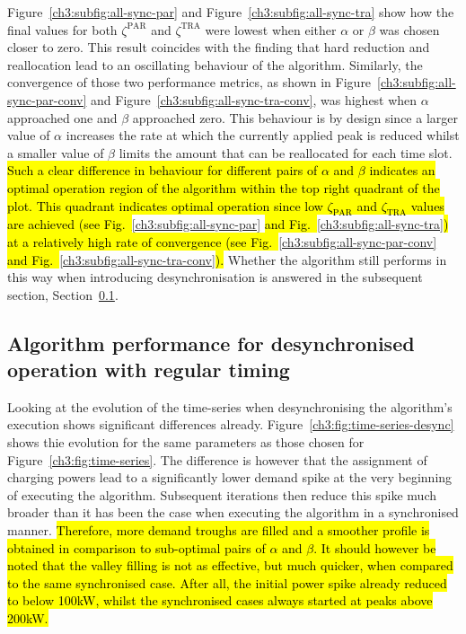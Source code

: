 Figure~\ref{ch3:subfig:all-sync-par} and Figure~\ref{ch3:subfig:all-sync-tra} show how the final values for both $\zeta^\text{PAR}$ and $\zeta^\text{TRA}$ were lowest when either $\alpha$ or $\beta$ was chosen closer to zero.
This result coincides with the finding that hard reduction and reallocation lead to an oscillating behaviour of the algorithm.
Similarly, the convergence of those two performance metrics, as shown in Figure~\ref{ch3:subfig:all-sync-par-conv} and Figure~\ref{ch3:subfig:all-sync-tra-conv}, was highest when $\alpha$ approached one and $\beta$ approached zero.
This behaviour is by design since a larger value of $\alpha$ increases the rate at which the currently applied peak is reduced whilst a smaller value of $\beta$ limits the amount that can be reallocated for each time slot.
\hl{Such a clear difference in behaviour for different pairs of $\alpha$ and $\beta$ indicates an optimal operation region of the algorithm within the top right quadrant of the plot.
This quadrant indicates optimal operation since low $\zeta_\text{PAR}$ and $\zeta_\text{TRA}$ values are achieved (see Fig.~}\ref{ch3:subfig:all-sync-par}\hl{ and Fig.~}\ref{ch3:subfig:all-sync-tra}\hl{) at a relatively high rate of convergence (see Fig.~}\ref{ch3:subfig:all-sync-par-conv}\hl{ and Fig.~}\ref{ch3:subfig:all-sync-tra-conv}\hl{).}
Whether the algorithm still performs in this way when introducing desynchronisation is answered in the subsequent section, Section~\ref{ch3:subsec:algorithm-performance-desynchronised-regular}.


\subsection{Algorithm performance for desynchronised operation with regular timing}
\label{ch3:subsec:algorithm-performance-desynchronised-regular}



Looking at the evolution of the time-series when desynchronising the algorithm's execution shows significant differences already.
Figure~\ref{ch3:fig:time-series-desync} shows thie evolution for the same parameters as those chosen for Figure~\ref{ch3:fig:time-series}.
The difference is however that the assignment of charging powers lead to a significantly lower demand spike at the very beginning of executing the algorithm.
Subsequent iterations then reduce this spike much broader than it has been the case when executing the algorithm in a synchronised manner.
\hl{Therefore, more demand troughs are filled and a smoother profile is obtained in comparison to sub-optimal pairs of $\alpha$ and $\beta$.
It should however be noted that the valley filling is not as effective, but much quicker, when compared to the same synchronised case.
After all, the initial power spike already reduced to below 100kW, whilst the synchronised cases always started at peaks above 200kW.}

